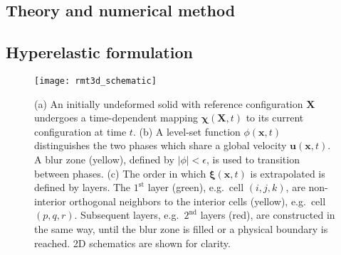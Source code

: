 \documentclass[times, 10pt]{article}
\renewcommand{\vec}[1]{\mathbf{#1}}
\newcommand{\vu}{\vec{u}}
\newcommand{\vx}{\vec{x}}
\newcommand{\vX}{\vec{X}}
\newcommand{\vxi}{\boldsymbol\xi}
\newcommand{\vchi}{\boldsymbol\chi}
\begin{document}
\begin{multicols}{2}
\section*{Theory and numerical method}

\subsection*{Hyperelastic formulation}

             \begin{figure*}[ht]
                \centering
                \texttt{[image: rmt3d\_schematic]}
                 \caption{
	        (a) An initially undeformed solid with reference configuration $\vX$ undergoes a
                time-dependent mapping $\vchi(\vX,t)$ to its current configuration at time
                $t$.
                (b) A level-set function $\phi(\vx,t)$ distinguishes the two phases which share
                a global velocity $\vu(\vx,t)$.
                A blur zone (yellow), defined by $|\phi|<\epsilon$, is
                used to transition between phases.
                (c) The order in which $\vxi(\vx, t)$ is extrapolated is defined by layers.
                The $1^\text{st}$ layer (green), e.g.~cell $(i, j, k)$, are non-interior orthogonal neighbors to the interior cells (yellow), e.g.~cell $(p, q, r)$.
                Subsequent layers, e.g.~$2^\text{nd}$ layers (red), are constructed in the same way,
                until the blur zone is filled or a physical boundary is reached.
                2D schematics are shown for clarity.
                \label{fig:overview}}
            \end{figure*}



\end{multicols}
\end{document}
